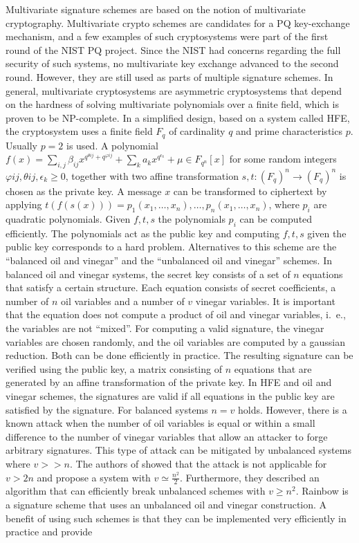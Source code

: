 Multivariate signature schemes are based on the notion of multivariate cryptography. Multivariate crypto schemes are candidates for a \ac{PQ} key-exchange mechanism, and a few examples of such cryptosystems were part of the first round of the \ac{NIST} \ac{PQ} project. Since the \ac{NIST} had concerns regarding the full security of such systems, no multivariate key exchange advanced to the second round. However, they are still used as parts of multiple signature schemes. In general, multivariate cryptosystems are asymmetric cryptosystems that depend on the hardness of solving multivariate polynomials over a finite field, which is proven to be NP-complete. In a simplified design, based on a system called \ac{HFE}, the cryptosystem uses a finite field \(F_q\) of cardinality \(q\) and prime characteristics \(p\). Usually  \(p = 2\) is used. A polynomial \(f(x) = \sum_{i,j} \beta_{ij}x^{q^{\theta{ij}} + q^{\varphi{ij}}} + \sum_{k} a_{k} x^{q^{\epsilon_{k}}} + \mu \in F_{q^n}[x]\) for some random integers \(\varphi{ij}, \theta{ij}, \epsilon_{k} \geq 0 \), together with two affine transformation \(s, t: (F_q)^n \to (F_q)^n\) is chosen as the private key. A message \(x\) can be transformed to ciphertext by applying \(t(f(s(x))) = p_1(x_1, \dots, x_n) , \dots, p_n(x_1,\dots,x_n) \), where \(p_i\) are quadratic polynomials. Given \(f, t, s\) the polynomials \(p_i\) can be computed efficiently. The polynomials act as the public key and computing \(f, t, s\) given the public key corresponds to a hard problem\cite{patarin1996hidden}. Alternatives to this scheme are the  ``balanced oil and vinegar'' and the ``unbalanced oil and vinegar'' schemes. In balanced oil and vinegar systems, the secret key consists of a set of \(n\) equations that satisfy a certain structure. Each equation consists of secret coefficients, a number of \(n\) oil variables and a number of \(v\) vinegar variables. It is important that the equation does not compute a product of oil and vinegar variables, i.~e., the variables are not ``mixed''. For computing a valid signature, the vinegar variables are chosen randomly, and the oil variables are computed by a gaussian reduction. Both can be done efficiently in practice. The resulting signature can be verified using the public key, a matrix consisting of \(n\) equations that are generated by an affine transformation of the private key. In \ac{HFE} and oil and vinegar schemes, the signatures are valid if all equations in the public key are satisfied by the signature. For balanced systems \(n = v\) holds. However, there is a known attack when the number of oil variables is equal or within a small difference to the number of vinegar variables that allow an attacker to forge arbitrary signatures. \cite{kipnis1998cryptanalysis}\cite{kipnis1999unbalanced} This type of attack can be mitigated by unbalanced systems where \(v >> n\). The authors of \cite{kipnis1999unbalanced} showed that the attack is not applicable for \(v > 2n\) and propose a system with \(v \simeq \frac{n^2}{2} \). Furthermore, they described an algorithm that can efficiently break unbalanced schemes with \(v \geq n^2 \). Rainbow is a signature scheme that uses an unbalanced oil and vinegar construction. A benefit of using such schemes is that they can be implemented very efficiently in practice and provide 